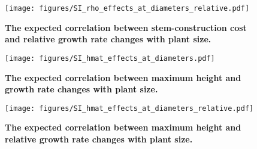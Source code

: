 \documentclass[12pt, a4paper]{article}
\makeatletter
\def\maxwidth{\ifdim\Gin@nat@width>\linewidth\linewidth
\else\Gin@nat@width\fi}
\let\Oldincludegraphics\includegraphics
\renewcommand{\includegraphics}[1]{\Oldincludegraphics[width=\maxwidth]{#1}}
\makeatother
\begin{document}
\begin{appendices}
\begin{figure}[ht]
\centering
\texttt{[image: figures/SI\_rho\_effects\_at\_diameters\_relative.pdf]}
\caption{\textbf{The expected correlation between stem-construction cost
and relative growth rate changes with plant size.}
\label{f-rho_growth_size_relative}}
\end{figure}

\begin{figure}[ht]
\centering
\texttt{[image: figures/SI\_hmat\_effects\_at\_diameters.pdf]}
\caption{\textbf{The expected correlation between maximum height and
growth rate changes with plant size.} \label{f-hmat_growth_size}}
\end{figure}

\begin{figure}[ht]
\centering
\texttt{[image: figures/SI\_hmat\_effects\_at\_diameters\_relative.pdf]}
\caption{\textbf{The expected correlation between maximum height and
relative growth rate changes with plant size.}
\label{f-hmat_growth_size_relative}}
\end{figure}


\end{appendices}
\end{document}
